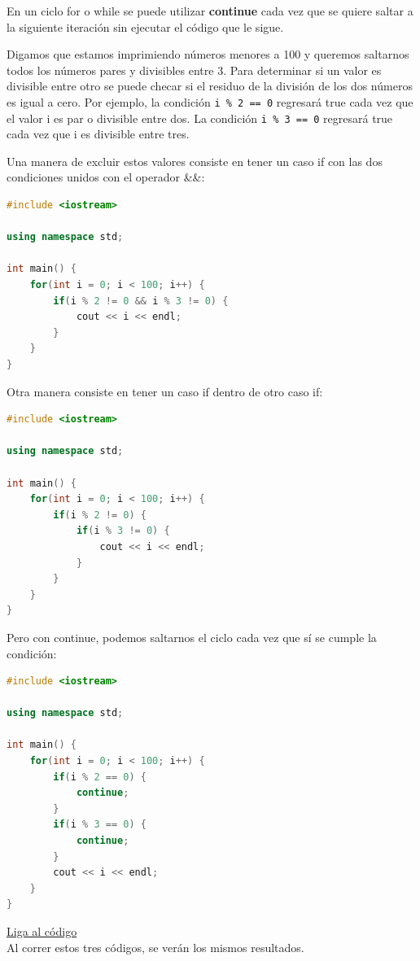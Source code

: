 \documentclass{article}
\begin{document}
En un ciclo for o while se puede utilizar \textbf{continue} cada vez que se quiere saltar a la siguiente iteración sin ejecutar el código que le sigue.

Digamos que estamos imprimiendo números menores a 100 y queremos saltarnos todos los números pares y divisibles entre 3. Para determinar si un valor es divisible entre otro se puede checar si el residuo de la división de los dos números es igual a cero. Por ejemplo, la condición \lstinline{i % 2 == 0} regresará true cada vez que el valor i es par o divisible entre dos. La condición \lstinline{i % 3 == 0} regresará true cada vez que i es divisible entre tres.

Una manera de excluir estos valores consiste en tener un caso if con las dos condiciones unidos con el operador \&\&:

\begin{lstlisting}[language=C++, title=Condiciones con AND]
#include <iostream>

using namespace std;

int main() {
	for(int i = 0; i < 100; i++) {
		if(i % 2 != 0 && i % 3 != 0) {
			cout << i << endl;
		}
	}
}
\end{lstlisting}

Otra manera consiste en tener un caso if dentro de otro caso if:

\begin{lstlisting}[language=C++, title=Condiciones anidados]
#include <iostream>

using namespace std;

int main() {
	for(int i = 0; i < 100; i++) {
		if(i % 2 != 0) {
			if(i % 3 != 0) {
				cout << i << endl;
			}
		}
	}
}
\end{lstlisting}

Pero con continue, podemos saltarnos el ciclo cada vez que sí se cumple la condición:

\begin{lstlisting}[language=C++, title=Continue]
#include <iostream>

using namespace std;

int main() {
	for(int i = 0; i < 100; i++) {
		if(i % 2 == 0) {
			continue;
		}
		if(i % 3 == 0) {
			continue;
		}
		cout << i << endl;
	}
}
\end{lstlisting}
\href{https://repl.it/@Jamesscn/Numeros-no-hexagonales}{Liga al código}\\

Al correr estos tres códigos, se verán los mismos resultados.
\end{document}
